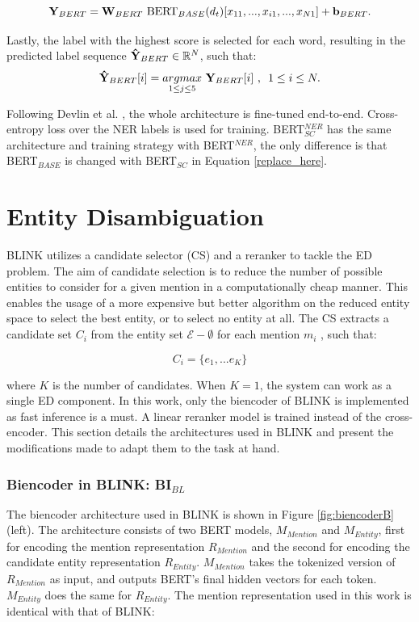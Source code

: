 \documentclass{report}
\theoremstyle{definition}
\theoremstyle{remark}
\begin{document}
\begin{equation}
\label{replace_here}
   \bold{Y}_{BERT} = \bold{W}_{BERT} \ \text{BERT}_{BASE}(d_t)[x_{11},...,x_{i1},...,x_{N1}] + \bold{b}_{BERT}.
\end{equation}

Lastly, the label with the highest score is selected for each word, resulting in the predicted label sequence $\bold{\Hat{Y}}_{BERT} \in \mathbb{R}^N$, such that:
\begin{equation}
    \bold{\Hat{Y}}_{BERT}[i] = \underset{1\leq j\leq5}{argmax} \ \bold{Y}_{BERT} [i] \ \text{, } \ 1\leq i \leq N. 
\end{equation}

Following Devlin et al. \cite{BERT}, the whole architecture is fine-tuned end-to-end. Cross-entropy loss over the NER labels is used for training. BERT$^{NER}_{SC}$ has the same architecture and training strategy with BERT$^{NER}$, the only difference is that BERT$_{BASE}$ is changed with BERT$_{SC}$ in Equation \ref{replace_here}.

\section{Entity Disambiguation}
\label{sec:entdismethod}
BLINK \cite{scalablezeroshot} utilizes a candidate selector (CS) and a reranker to tackle the ED problem. The aim of candidate selection is to reduce the number of possible entities to consider for a given mention in a computationally cheap manner. This enables the usage of a more expensive but better algorithm on the reduced entity space to select the best entity, or to select no entity at all. The CS extracts a candidate set $C_i$ from the entity set $\mathcal{E} - \emptyset$ for each mention $m_i$ , such that:

\begin{equation}
    C_i = \{e_1,...e_K\} 
\end{equation}

\noindent where $K$ is the number of candidates. When $K=1$, the system can work as a single ED component. In this work, only the biencoder of BLINK is implemented as fast inference is a must. A linear reranker model is trained instead of the cross-encoder. This section details the architectures used in BLINK and present the modifications made to adapt them to the task at hand.

\subsubsection{Biencoder in BLINK: BI$_{BL}$}
\label{sec:biencoderbexplanation}
The biencoder architecture used in BLINK is shown in Figure \ref{fig:biencoderB} (left). The architecture consists of two BERT models, $M_{Mention}$ and $M_{Entity}$, first for encoding the mention representation $R_{Mention}$ and the second for encoding the candidate entity representation $R_{Entity}$. $M_{Mention}$ takes the tokenized version of $R_{Mention}$ as input, and outputs BERT's final hidden vectors for each token. $M_{Entity}$ does the same for $R_{Entity}$. The mention representation used in this work is identical with that of BLINK:
\end{document}
